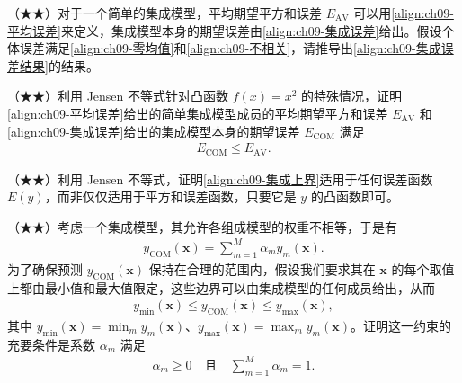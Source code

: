 \documentclass[../../main.tex]{subfiles}
\begin{document}
\begin{exercise}\label{exercise:ch09-14}
（★★）对于一个简单的集成模型，平均期望平方和误差 $E_{\mathrm{AV}}$ 可以用\eqref{align:ch09-平均误差}来定义，集成模型本身的期望误差由\eqref{align:ch09-集成误差}给出。假设个体误差满足\eqref{align:ch09-零均值}和\eqref{align:ch09-不相关}，请推导出\eqref{align:ch09-集成误差结果}的结果。
\end{exercise}

\begin{exercise}\label{exercise:ch09-15}
（★★）利用 Jensen 不等式针对凸函数 $f(x)=x^{2}$ 的特殊情况，证明\eqref{align:ch09-平均误差}给出的简单集成模型成员的平均期望平方和误差 $E_{\mathrm{AV}}$ 和\eqref{align:ch09-集成误差}给出的集成模型本身的期望误差 $E_{\mathrm{COM}}$ 满足
\begin{align}
E_{\mathrm{COM}}\leqslant E_{\mathrm{AV}}.
\label{align:ch09-集成上界}
\end{align}
\end{exercise}

\begin{exercise}\label{exercise:ch09-16}
（★★）利用 Jensen 不等式，证明\eqref{align:ch09-集成上界}适用于任何误差函数 $E(y)$，而非仅仅适用于平方和误差函数，只要它是 $y$ 的凸函数即可。
\end{exercise}

\begin{exercise}\label{exercise:ch09-17}
（★★）考虑一个集成模型，其允许各组成模型的权重不相等，于是有
\begin{align}
y_{\mathrm{COM}}(\boldsymbol{x})=\sum_{m=1}^{M}\alpha_{m}y_{m}(\boldsymbol{x}).
\label{align:ch09-加权集成}
\end{align}
为了确保预测 $y_{\mathrm{COM}}(\boldsymbol{x})$ 保持在合理的范围内，假设我们要求其在 $\boldsymbol{x}$ 的每个取值上都由最小值和最大值限定，这些边界可以由集成模型的任何成员给出，从而
\begin{align}
y_{\min}(\boldsymbol{x})\leqslant y_{\mathrm{COM}}(\boldsymbol{x})\leqslant y_{\max}(\boldsymbol{x}),
\label{align:ch09-加权集成界}
\end{align}
其中 $y_{\min}(\boldsymbol{x})=\min_{m}y_{m}(\boldsymbol{x})$、$y_{\max}(\boldsymbol{x})=\max_{m}y_{m}(\boldsymbol{x})$。证明这一约束的充要条件是系数 $\alpha_{m}$ 满足
\begin{align}
\alpha_{m}\geqslant0\quad\text{且}\quad\sum_{m=1}^{M}\alpha_{m}=1.
\label{align:ch09-权重条件}
\end{align}
\end{exercise}
\end{document}

